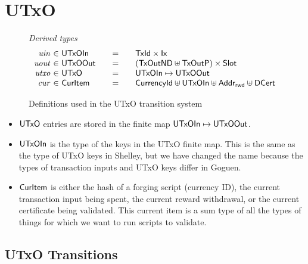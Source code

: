 \section{UTxO}
\label{sec:utxo}


\begin{figure*}[htb]
  \emph{Derived types}
  \begin{equation*}
    \begin{array}{r@{~\in~}l@{\qquad=\qquad}lr}
      \var{uin}
      & \UTxOIn
      & \TxId \times \Ix
      \\
      \var{uout}
      & \UTxOOut
      & (\TxOutND \uniondistinct \TxOutP) \times \Slot
      \\
      \var{utxo}
      & \UTxO
      & \UTxOIn \mapsto \UTxOOut
      \\
      \var{cur}
      & \CurItem
      & \CurrencyId \uniondistinct \UTxOIn \uniondistinct \AddrRWD \uniondistinct \DCert
    \end{array}
  \end{equation*}
  \caption{Definitions used in the UTxO transition system}
  \label{fig:defs:utxo-shelley-1}
\end{figure*}


\begin{itemize}
\item $\mathsf{UTxO}$ entries are stored in the finite map $\mathsf{UTxOIn}\mapsto \mathsf{UTxOOut}$.

    \item $\mathsf{UTxOIn}$ is the type of the keys in the UTxO finite map. This
  is the same as the type of UTxO keys in Shelley, but we have changed
  the name because the types of transaction inputs and UTxO keys
  differ in Goguen.

  \item $\mathsf{CurItem}$ is either the hash of a
  forging script (currency ID), the current transaction input being
  spent, the current reward
  withdrawal, or the current certificate being validated.
  This current item is a sum type of all the types of things for which we want to
  run scripts to validate.

\end{itemize}

\subsection{UTxO Transitions}
\label{sec:utxo-trans}


